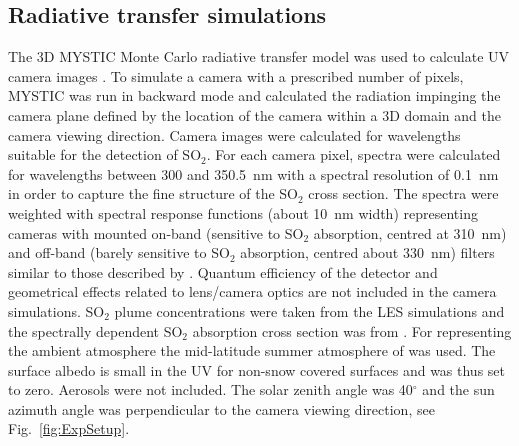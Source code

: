 \documentclass[amtd, manuscript]{copernicus}
\begin{document}
\subsection{Radiative transfer simulations}
The 3D MYSTIC Monte Carlo radiative transfer model was used to
calculate UV camera images \citep{Mayer2010,Emde2010,Buras2011a,Kylling2020}.
To simulate a camera with a prescribed number of pixels, MYSTIC was run
in backward mode and calculated the  radiation impinging the camera
plane defined by the location of the camera within a 3D domain and the
camera viewing direction. Camera images were calculated for
wavelengths suitable for the detection of SO$_2$.
For each camera pixel, spectra were calculated for wavelengths between
300 and 350.5~nm with a spectral resolution of 0.1~nm in order to
capture the fine structure of the SO$_2$ cross section. The spectra were
weighted with spectral response functions (about 10~nm width)
representing cameras with mounted on-band
(sensitive to SO$_2$ absorption, centred at 310~nm) and off-band (barely sensitive to SO$_2$
absorption, centred about 330~nm) filters similar to those described
by \citet{Gliss2018}. Quantum efficiency of the detector and
geometrical effects related to lens/camera optics are not included in
the camera simulations.
SO$_2$ plume concentrations were taken from the LES simulations and
the spectrally dependent SO$_2$ absorption cross section was from
\citet{Hermans2009}.
For representing the ambient atmosphere the mid-latitude summer atmosphere of
\citet{Anderson1986} was used. The surface albedo is small in the UV
for non-snow covered surfaces and was thus set to zero. Aerosols were
not included. The solar zenith angle was 40$^{\circ}$ and the
sun azimuth angle was perpendicular to the camera viewing direction,
see Fig.~\ref{fig:ExpSetup}.
\end{document}
